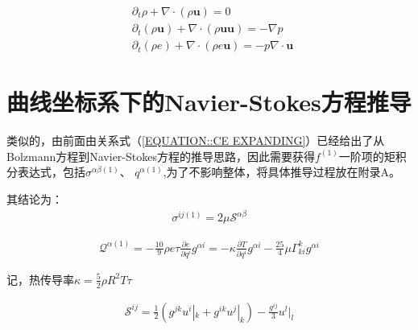 \documentclass[LBMDerivation.tex]{subfiles}
\begin{document}
\begin{equation}
  \begin{aligned}
     & \partial_t \rho + \nabla \cdot (\rho \boldsymbol{u})=0                                                      \\
     & \partial_{t}\left(\rho \boldsymbol{u} \right)+ \nabla \cdot (\rho \boldsymbol{u} \boldsymbol{u}) =-\nabla p \\
     & \partial_{t}\left(\rho e \right) + \nabla \cdot (\rho e \boldsymbol{u})=-p \nabla \cdot \boldsymbol{u}
  \end{aligned}
  \label{EQUATION::Eluer2} ~
\end{equation}
%


%
%
%
%
%
\section{曲线坐标系下的Navier-Stokes方程推导}
%
%

类似的，由前面由关系式（\ref{EQUATION::CE EXPANDING}）已经给出了从Bolzmann方程到Navier-Stokes方程的推导思路，因此需要获得$f^{(1)}$一阶项的矩积分表达式，包括$\sigma^{\alpha\beta(1)}$、 $q^{\alpha (1)}$,为了不影响整体，将具体推导过程放在附录A。


其结论为：
\begin{equation}
  \begin{gathered}
    \sigma^{ij(1)}= 2 \mu \mathcal{S}^{\alpha\beta}
  \end{gathered}
\end{equation}




\begin{equation}
  \begin{gathered}
    \mathcal{Q}^{\alpha (1)}
    = -\frac{10}{9}\rho e \tau \frac{\partial e}{\partial q^i} g^{\alpha i}=  -\kappa \frac{\partial T}{\partial q^i} g^{\alpha i} - \frac{25}{4}\mu \Gamma_{ki}^{k}g^{\alpha i}
  \end{gathered}
\end{equation}

记，热传导率$\kappa=\frac{5}{2}\rho R^2 T \tau$




\begin{equation}
  \begin{gathered}
    \mathcal{S}^{ij}=\frac{1}{2} (g^{jk} u^i|_k+g^{ik} u^j|_k) -\frac{g^{ij}}{3}u^l|_l
  \end{gathered}
\end{equation}
\end{document}
